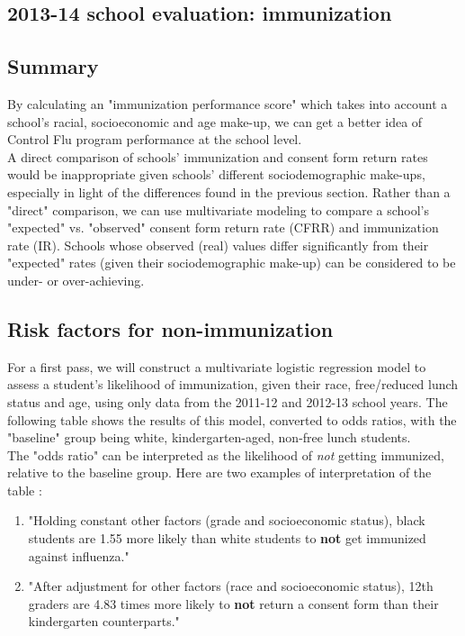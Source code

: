\begin{center}
\section*{2013-14 school evaluation: immunization}
\end{center}
\begin{multicols}{2}


\subsection*{Summary}
By calculating an "immunization performance score" which takes into account a school's racial, socioeconomic and age make-up, we can get a better idea of Control Flu program performance at the school level. \\



A direct comparison of schools' immunization and consent form return rates would be inappropriate given schools' different sociodemographic make-ups, especially in light of the differences found in the previous section.  Rather than a "direct" comparison, we can use multivariate modeling to compare a school's "expected" vs. "observed" consent form return rate (CFRR) and immunization rate (IR).  Schools whose observed (real) values differ significantly from their "expected" rates (given their sociodemographic make-up) can be considered to be under- or over-achieving.  \\

\subsection*{Risk factors for non-immunization}


For a first pass, we will construct a multivariate logistic regression model to assess a student's likelihood of immunization, given their race, free/reduced lunch status and age, using only data from the 2011-12 and 2012-13 school years.  The following table shows the results of this model, converted to odds ratios, with the "baseline" group being white, kindergarten-aged, non-free lunch students. \\ 


The "odds ratio" can be interpreted as the likelihood of \emph{not} getting immunized, relative to the baseline group.  Here are two examples of interpretation of the  table :\begin{enumerate}
\item "Holding constant other factors (grade and socioeconomic status), black students are 1.55 more likely than white students to \textbf{not} get immunized against influenza."
\item "After adjustment for other factors (race and socioeconomic status), 12th graders are 4.83 times more likely to \textbf{not} return a consent form than their kindergarten counterparts."
\end{enumerate}


\end{multicols}
